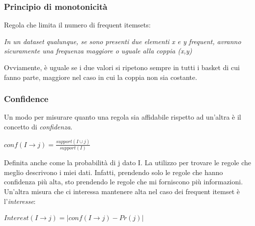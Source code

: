 \subsubsection{Principio di monotonicità}
Regola che limita il numero di frequent itemsets:
\begin{center}
    \textit{In un dataset qualunque, se sono presenti due elementi x e y frequent, avranno sicuramente una frequenza maggiore o uguale alla coppia (x,y)}
\end{center}
Ovviamente, è uguale se i due valori si ripetono sempre in tutti i basket di cui fanno parte, maggiore nel caso in cui la coppia non sia costante.

\newpage

\subsubsection{Confidence}
Un modo per misurare quanto una regola sia affidabile rispetto ad un'altra è il concetto di \textit{confidenza}.
\begin{center}
        \begin{math}
            conf(I \rightarrow j) = \frac{support(I  \cup  j)}{support(I)}
        \end{math}
\end{center}
Definita anche come la probabilità di j dato I. La utilizzo per trovare le regole che meglio descrivono i miei dati. Infatti, prendendo solo le regole che hanno confidenza più alta, sto prendendo le regole che mi forniscono più informazioni. Un'altra misura che ci interessa mantenere alta nel caso dei frequent itemset è l'\textit{interesse}:
\begin{center}
    \begin{math}
        Interest(I \rightarrow j) = |conf(I \rightarrow j) - Pr(j)|
    \end{math}
\end{center}

